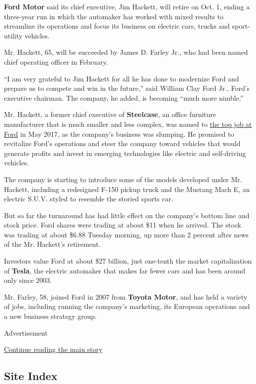 \textbf{Ford Motor} said its chief executive, Jim Hackett, will retire
on Oct. 1, ending a three-year run in which the automaker has worked
with mixed results to streamline its operations and focus its business
on electric cars, trucks and sport-utility vehicles.

Mr. Hackett, 65, will be succeeded by James D. Farley Jr., who had been
named chief operating officer in February.

``I am very grateful to Jim Hackett for all he has done to modernize
Ford and prepare us to compete and win in the future,'' said William
Clay Ford Jr., Ford's executive chairman. The company, he added, is
becoming ``much more nimble.''

Mr. Hackett, a former chief executive of \textbf{Steelcase}, an office
furniture manufacturer that is much smaller and less complex, was named
to
\href{https://www.nytimes.com/2017/05/22/business/jim-hackett-ford.html}{the
top job at Ford} in May 2017, as the company's business was slumping. He
promised to revitalize Ford's operations and steer the company toward
vehicles that would generate profits and invest in emerging technologies
like electric and self-driving vehicles.

The company is starting to introduce some of the models developed under
Mr. Hackett, including a redesigned F-150 pickup truck and the Mustang
Mach E, an electric S.U.V. styled to resemble the storied sports car.

But so far the turnaround has had little effect on the company's bottom
line and stock price. Ford shares were trading at about \$11 when he
arrived. The stock was trading at about \$6.88 Tuesday morning, up more
than 2 percent after news of the Mr. Hackett's retirement.

Investors value Ford at about \$27 billion, just one-tenth the market
capitalization of \textbf{Tesla}, the electric automaker that makes far
fewer cars and has been around only since 2003.

Mr. Farley, 58, joined Ford in 2007 from \textbf{Toyota Motor}, and has
held a variety of jobs, including running the company's marketing, its
European operations and a new business strategy group.

Advertisement

\protect\hyperlink{after-bottom}{Continue reading the main story}

\hypertarget{site-index}{%
\subsection{Site Index}\label{site-index}}

